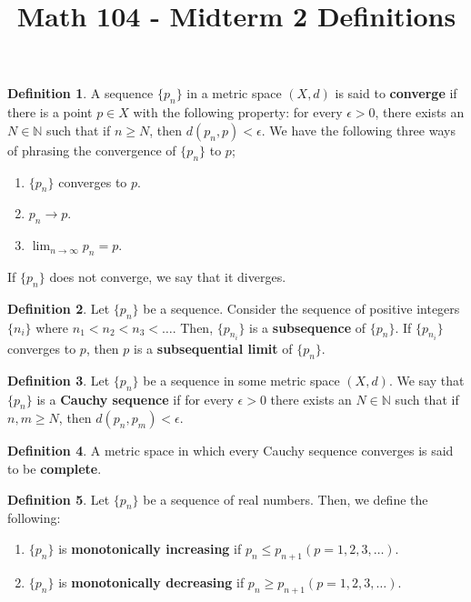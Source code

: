 \documentclass[12pt]{article}
\theoremstyle{definition}
\newtheorem{definition}{Definition}
\theoremstyle{named}
\begin{document}
\title{Math 104 - Midterm 2 Definitions}
\author{}
\date{}
\maketitle
\date

\renewcommand{\thedefinition}{3.1}
\begin{definition}
 A sequence $\{p_n\}$ in a metric space $(X,d)$ is said to \textbf{converge} if there is a point $p \in X$ with the following property: for every $\epsilon > 0$, there exists an $N \in \mathbb{N}$ such that if $n \geq N$, then $d(p_n,p) < \epsilon$. We have the following three ways of phrasing the convergence of $\{p_n\}$ to $p$; 
 \begin{enumerate}
    \item $\{p_n\}$ converges to $p$. 
    \item $p_n \to p$. 
    \item $\lim_{n \to \infty} p_n = p$. 
 \end{enumerate}
 If $\{p_n\}$ does not converge, we say that it diverges. 
\end{definition}

\renewcommand{\thedefinition}{3.5}
\begin{definition}
    Let $\{p_n\}$ be a sequence. Consider the sequence of positive integers $\{n_i\}$ where $n_1 < n_2 < n_3 < \dots$. Then, $\{p_{n_i}\}$ is a \textbf{subsequence} of $\{p_n\}$. If $\{p_{n_i}\}$ converges to $p$, then $p$ is a \textbf{subsequential limit} of $\{p_n\}$. 
\end{definition}

\renewcommand{\thedefinition}{3.8}
\begin{definition}
    Let $\{p_n\}$ be a sequence in some metric space $(X,d)$. We say that $\{p_n\}$ is a \textbf{Cauchy sequence} if for every $\epsilon > 0$ there exists an $N \in \mathbb{N}$ such that if $n, m \geq N$, then $d(p_n, p_m) < \epsilon$. 
\end{definition}

\renewcommand{\thedefinition}{3.12}
\begin{definition}
    A metric space in which every Cauchy sequence converges is said to be \textbf{complete}. 
\end{definition}

\renewcommand{\thedefinition}{3.13}
\begin{definition}
    Let $\{p_n\}$ be a sequence of real numbers. Then, we define the following: 
    \begin{enumerate}
        \item $\{p_n\}$ is \textbf{monotonically increasing} if $p_n \leq p_{n+1} (p = 1,2,3, \dots)$. 
        \item $\{p_n\}$ is \textbf{monotonically decreasing} if $p_n \geq p_{n+1} (p = 1,2,3, \dots)$. 
    \end{enumerate}
\end{definition}
\end{document}
